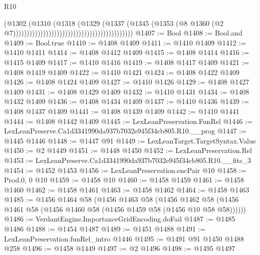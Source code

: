 \begin{lexlean}{R10}
\begin{coremodule}
                                                                          (@1302
                                                                            (@1310
                                                                              (@1318
                                                                                (@1329
                                                                                  (@1337
                                                                                    (@1345
                                                                                      (@1353
                                                                                        (@8
                                                                                          @1360
                                                                                          (@2
                                                                                            @7))))))))))))))))))))))))))))))))))))))))))))
@1407 := Bool
@1408 := Bool.and
@1409 := Bool.true
@1410 := @1408 @1409
@1411 := @1410 @1409
@1412 := @1410 @1411
@1414 := @1408 @1412 @1409
@1415 := @1408 @1414
@1416 := @1415 @1409
@1417 := @1410 @1416
@1419 := @1408 @1417 @1409
@1421 := @1408 @1419 @1409
@1422 := @1410 @1421
@1424 := @1408 @1422 @1409
@1426 := @1408 @1424 @1409
@1427 := @1410 @1426
@1429 := @1408 @1427 @1409
@1431 := @1408 @1429 @1409
@1432 := @1410 @1431
@1434 := @1408 @1432 @1409
@1436 := @1408 @1434 @1409
@1437 := @1410 @1436
@1439 := @1408 @1437 @1409
@1441 := @1408 @1439 @1409
@1442 := @1410 @1441
@1444 := @1408 @1442 @1409
@1445 := LexLeanPreservation.FunRel
@1446 := LexLeanPreserve.Ca1d3341990da937b7032e945f34cb805.R10.__prog
@1447 := @1445 @1446
@1448 := @1447 @91
@1449 := LexLeanTarget.TargetSyntax.Value
@1450 := @2 @1449
@1451 := @1448 @1450
@1452 := LexLeanPreservation.Rel
@1453 := LexLeanPreserve.Ca1d3341990da937b7032e945f34cb805.R10.__fits_3
@1454 := @1452 @1453
@1456 := LexLeanPreservation.encPair @10
@1458 := Prod.{0, 0} @10
@1459 := @1458 @10
@1460 := @1458 @1459
@1461 := @1458 @1460
@1462 := @1458 @1461
@1463 := @1458 @1462
@1464 := @1458 @1463
@1485 := @1456
    @1464
    @58
    (@1456
      @1463
      @58
      (@1456 @1462 @58 (@1456 @1461 @58 (@1456 @1460 @58 (@1456 @1459 @58 (@1456 @10 @58 @58))))))
@1486 := VerdantEngine.ImportanceGridEncoding.doFail
@1487 := @1485 @1486
@1488 := @1454 @1487
@1489 := @1451 @1488
@1491 := LexLeanPreservation.funRel_intro @1446
@1495 := @1491 @91 @1450 @1488 @258
@1496 := @1458 @1449
@1497 := @2 @1496
@1498 := @1495 @1497

\end{coremodule}
\end{lexlean}
